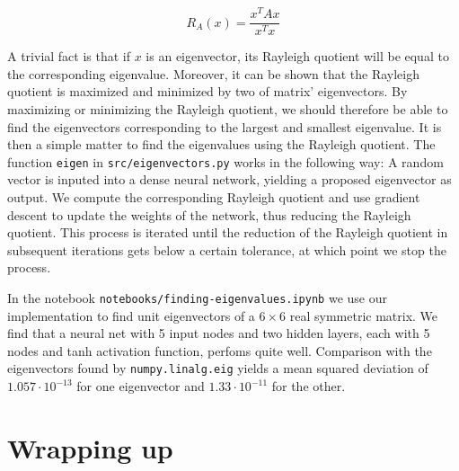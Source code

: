 \documentclass{article}
\begin{document}
\begin{equation}
    R_A(x) = \frac{x^T A x}{x^T x}
\end{equation}

A trivial fact is that if $x$ is an eigenvector, its Rayleigh quotient will be equal to the corresponding eigenvalue. Moreover, it can be shown that the Rayleigh quotient is maximized and minimized by two of matrix' eigenvectors. By maximizing or minimizing the Rayleigh quotient, we should therefore be able to find the eigenvectors corresponding to the largest and smallest eigenvalue. It is then a simple matter to find the eigenvalues using the Rayleigh quotient. The function \texttt{eigen} in \texttt{src/eigenvectors.py} works in the following way: A random vector is inputed into a dense neural network, yielding a proposed eigenvector as output. We compute the corresponding Rayleigh quotient and use gradient descent to update the weights of the network, thus reducing the Rayleigh quotient. This process is iterated until the reduction of the Rayleigh quotient in subsequent iterations gets below a certain tolerance, at which point we stop the process.

In the notebook \texttt{notebooks/finding-eigenvalues.ipynb} we use our implementation to find unit eigenvectors of a $6 \times 6$ real symmetric matrix. We find that a neural net with 5 input nodes and two hidden layers, each with 5 nodes and tanh activation function, perfoms quite well. Comparison with the eigenvectors found by \texttt{numpy.linalg.eig} yields a mean squared deviation of $1.057 \cdot 10^{-13}$ for one eigenvector and $1.33 \cdot10^{-11}$ for the other.

\section{Wrapping up}
\end{document}
